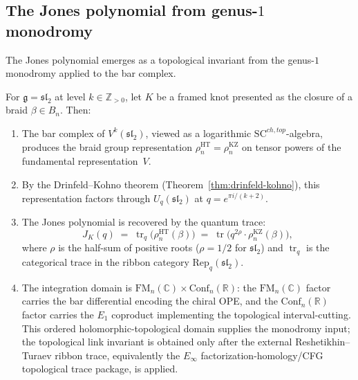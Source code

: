 \subsection{The Jones polynomial from genus-$1$ monodromy}
\label{sec:jones-genus1}

The Jones polynomial emerges as a topological invariant from the
genus-$1$ monodromy applied to the bar complex.

\begin{theorem}
\label{thm:jones-genus1}
For $\mathfrak{g} = \mathfrak{sl}_2$ at level $k \in \mathbb{Z}_{>0}$,
let $K$ be a framed knot presented as the closure of a braid
$\beta \in B_n$. Then:
\begin{enumerate}[label=\textup{(\roman*)}]
\item The bar complex of $V^k(\mathfrak{sl}_2)$, viewed as a
 logarithmic $\mathrm{SC}^{ch,top}$-algebra, produces the braid
 group representation $\rho_n^{\mathrm{HT}} = \rho_n^{\mathrm{KZ}}$
 on tensor powers of the fundamental representation~$V$.

\item By the Drinfeld--Kohno theorem
 \textup{(}Theorem~\textup{\ref{thm:drinfeld-kohno}}\textup{)},
 this representation factors through
 $U_q(\mathfrak{sl}_2)$ at $q = e^{\pi i/(k+2)}$.

\item The Jones polynomial is recovered by the quantum trace:
 \begin{equation}\label{eq:jones-from-bar}
 J_K(q)
 \;=\;
 \operatorname{tr}_q\bigl(\rho_n^{\mathrm{HT}}(\beta)\bigr)
 \;=\;
 \operatorname{tr}\bigl(q^{2\rho} \cdot \rho_n^{\mathrm{KZ}}(\beta)\bigr),
 \end{equation}
 where $\rho$ is the half-sum of positive roots
 \textup{(}$\rho = 1/2$ for $\mathfrak{sl}_2$\textup{)} and
 $\operatorname{tr}_q$ is the categorical trace in the ribbon
 category $\mathrm{Rep}_q(\mathfrak{sl}_2)$.

\item The integration domain is $\mathrm{FM}_n(\mathbb{C}) \times
 \mathrm{Conf}_n(\mathbb{R})$: the $\mathrm{FM}_n(\mathbb{C})$
 factor carries the bar differential encoding the chiral OPE, and the
 $\mathrm{Conf}_n(\mathbb{R})$ factor carries the $E_1$ coproduct
 implementing the topological interval-cutting. This ordered
 holomorphic-topological domain supplies the monodromy input; the
 topological link invariant is obtained only after the external
 Reshetikhin--Turaev ribbon trace, equivalently the
 $E_\infty$ factorization-homology/CFG topological trace package, is
 applied.
\end{enumerate}
\end{theorem}

